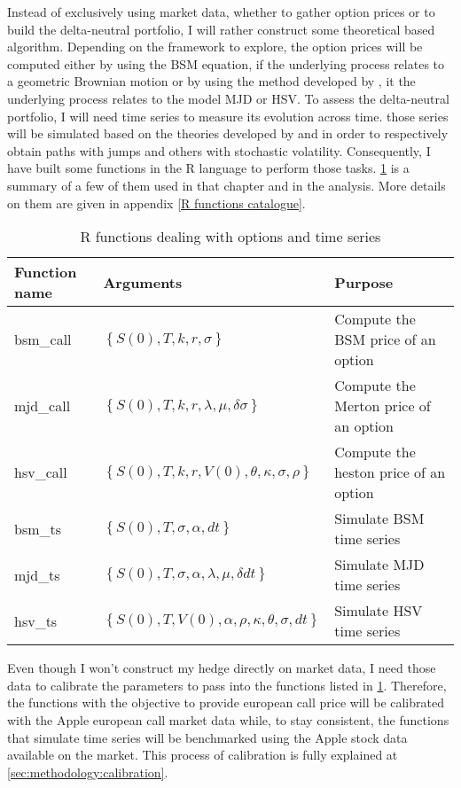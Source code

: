 \documentclass[12pt]{report}
\begin{document}
Instead of exclusively using market data, whether to gather option prices or to build the delta-neutral portfolio, I will rather construct some theoretical based algorithm.
Depending on the framework to explore, the option prices will be computed either by using the BSM equation, if the underlying process relates to a geometric Brownian motion or by using the method developed by \citet{heston1993}, it the underlying process relates to the model MJD or HSV.
To assess the delta-neutral portfolio, I will need time series to measure its evolution across time. those series will be simulated based on the theories developed by \citet{merton76} and \citet{heston1993} in order to respectively obtain paths with jumps and others with stochastic volatility.
Consequently, I have built some functions in the R language to perform those tasks. \cref{t:methodology:r} is a summary of a few of them used in that chapter and in the analysis. More details on them are given in appendix \cref{R functions catalogue}.

\begin{table}[ht]
  \begin{tabularx}{\textwidth}{llX}
    \hline
    Function name & Arguments & Purpose \\
    \hline
    bsm\_call & $\left \{ S(0), T, k, r, \sigma \right \}$ & Compute the BSM price of an option \\
    mjd\_call & $\left \{ S(0), T, k, r, \lambda, \mu, \delta \sigma \right \}$ & Compute the Merton price of an option \\
    hsv\_call & $\left \{ S(0), T, k, r, V(0), \theta, \kappa, \sigma, \rho \right \}$ & Compute the heston price of an option \\
    bsm\_ts & $\left \{ S(0), T, \sigma, \alpha, dt \right \}$ & Simulate BSM time series \\
    mjd\_ts & $\left \{ S(0), T, \sigma, \alpha, \lambda, \mu, \delta dt \right \}$ & Simulate MJD time series \\
    hsv\_ts & $\left \{ S(0), T, V(0), \alpha, \rho, \kappa, \theta, \sigma, dt \right \}$ & Simulate HSV time series \\
  \end{tabularx}
  \caption{R functions dealing with options and time series}
  \label{t:methodology:r}
\end{table}

Even though I won't construct my hedge directly on market data, I need those data to calibrate the parameters to pass into the functions listed in \cref{t:methodology:r}.
Therefore, the functions with the objective to provide european call price will be calibrated with the Apple european call market data while, to stay consistent, the functions that simulate time series will be benchmarked using the Apple stock data available on the market.
This process of calibration is fully explained at \cref{sec:methodology:calibration}.
\end{document}

